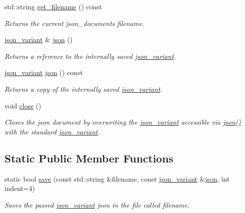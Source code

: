 \begin{DoxyCompactItemize}
std\+::string \hyperlink{classJSONLIB__NAMESPACE_1_1json__document_a6f362476926f33fb8c3437d15052e959}{get\+\_\+filename} () const
\begin{DoxyCompactList}\small\item\em Returns the current json\+\_\+documents {\itshape filename}. \end{DoxyCompactList}\item 
\hyperlink{classJSONLIB__NAMESPACE_1_1json__variant}{json\+\_\+variant} \& \hyperlink{classJSONLIB__NAMESPACE_1_1json__document_ad87b8e7d68ba854dbd730758273a3b93}{json} ()
\begin{DoxyCompactList}\small\item\em Returns a reference to the internally saved \hyperlink{classJSONLIB__NAMESPACE_1_1json__variant}{json\+\_\+variant}. \end{DoxyCompactList}\item 
\hyperlink{classJSONLIB__NAMESPACE_1_1json__variant}{json\+\_\+variant} \hyperlink{classJSONLIB__NAMESPACE_1_1json__document_afc25f82f6d2729be0ae1bcc82b8968e3}{json} () const
\begin{DoxyCompactList}\small\item\em Returns a copy of the internally saved \hyperlink{classJSONLIB__NAMESPACE_1_1json__variant}{json\+\_\+variant}. \end{DoxyCompactList}\item 
\mbox{\label{classJSONLIB__NAMESPACE_1_1json__document_a0a79ac1420c95c0f1de9670c7f81537d}} 
void \hyperlink{classJSONLIB__NAMESPACE_1_1json__document_a0a79ac1420c95c0f1de9670c7f81537d}{close} ()
\begin{DoxyCompactList}\small\item\em Closes the json document by overwriting the \hyperlink{classJSONLIB__NAMESPACE_1_1json__variant}{json\+\_\+variant} accessible via \hyperlink{classJSONLIB__NAMESPACE_1_1json__document_ad87b8e7d68ba854dbd730758273a3b93}{json()} with the standard \hyperlink{classJSONLIB__NAMESPACE_1_1json__variant}{json\+\_\+variant}. \end{DoxyCompactList}\end{DoxyCompactItemize}
\subsection*{Static Public Member Functions}
\begin{DoxyCompactItemize}
\item 
static bool \hyperlink{classJSONLIB__NAMESPACE_1_1json__document_af8f392a0ffc779277ead1f2bdb222930}{save} (const std\+::string \&filename, const \hyperlink{classJSONLIB__NAMESPACE_1_1json__variant}{json\+\_\+variant} \&\hyperlink{classJSONLIB__NAMESPACE_1_1json__document_ad87b8e7d68ba854dbd730758273a3b93}{json}, int indent=4)
\begin{DoxyCompactList}\small\item\em Saves the passed \hyperlink{classJSONLIB__NAMESPACE_1_1json__variant}{json\+\_\+variant} {\ttfamily json} in the file called {\ttfamily filename}. \end{DoxyCompactList}\end{DoxyCompactItemize}


